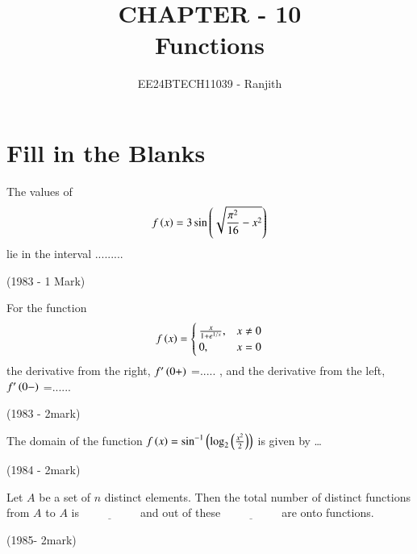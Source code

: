\documentclass[journal]{IEEEtran}
\begin{document}

\onecolumn

\title{CHAPTER - 10\\Functions}
\author{EE24BTECH11039 - Ranjith}
\maketitle


\renewcommand{\thefigure}{\theenumi}
\renewcommand{\thetable}{\theenumi}


\section{ Fill in the Blanks}


\begin{enumerate}
    \item The values of \begin{align*}f\left(x\right)=3\sin\left(\sqrt{\frac{\pi^2}{16}-x^2}\right)\end{align*}lie in the interval .........
    
    
    \hfill{(1983 - 1 Mark)}
    
    
     \item For the function \begin{align*}f\left(x\right) = \begin{cases} \frac{x}{1 + e^{1/x}}, & x \neq 0 \\ 0, & x = 0 \end{cases} \end{align*}
    the derivative from the right, $f'\left(0+\right)$ =..... , and the derivative from the left, $f'\left(0-\right)$ =......
    
    
     
    \hfill{(1983 - 2mark)}
    
    \item{The domain of the function $f\left(x\right)=\sin^{-1}\left(\log_{2}\left(\frac{x^{2}}{2}\right)\right)$ is given by \ldots \
    
    
    \hfill 
    {(1984 - 2mark)}
    
    \item Let \( A \) be a set of \( n \) distinct elements. Then the total number of distinct functions from \( A \) to \( A \) is \( \underline{\hspace{2cm}} \) and out of these \( \underline{\hspace{2cm}} \) are onto functions.
    
    \hfill
    {(1985- 2mark)}
    
}
\end{enumerate}
\end{document}

